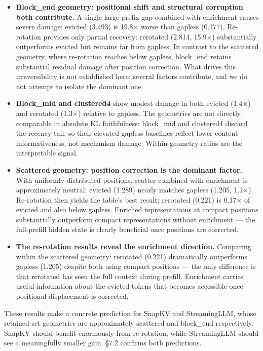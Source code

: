 \documentclass[10pt,letterpaper]{article}
\providecommand{\tightlist}{%
  \setlength{\itemsep}{0pt}\setlength{\parskip}{0pt}}
\begin{document}
\begin{itemize}
\tightlist
\item
  \textbf{Block\_end geometry: positional shift and structural
  corruption both contribute.} A single large prefix gap combined with
  enrichment causes severe damage: evicted (3.493) is 19.8× worse than
  gapless (0.177).
  Re-rotation provides only partial recovery: rerotated (2.814, 15.9×)
  substantially outperforms evicted but remains far from gapless. In
  contrast to the scattered geometry, where re-rotation reaches below
  gapless, block\_end retains substantial residual damage after position
  correction. What drives this irreversibility is not established here;
  several factors contribute, and we do not attempt to isolate the
  dominant one.
\item
  \textbf{Block\_mid and clustered4} show modest damage in both evicted
  (1.4×) and rerotated (1.3×) relative to gapless. The geometries are
  not directly comparable in absolute KL faithfulness: block\_mid and
  clustered4 discard the recency tail, so their elevated gapless
  baselines reflect lower content informativeness, not mechanism damage.
  Within-geometry ratios are the interpretable signal.
\item
  \textbf{Scattered geometry: position correction is the dominant
  factor.} With uniformly-distributed positions, scatter combined with
  enrichment is approximately neutral: evicted (1.289) nearly matches
  gapless (1.205, 1.1×). Re-rotation then yields the table's best
  result: rerotated (0.221) is 0.17× of evicted and also below gapless.
  Enriched representations at compact positions substantially outperform
  compact representations without enrichment --- the full-prefill hidden
  state is clearly beneficial once positions are corrected.
\item
  \textbf{The re-rotation results reveal the enrichment direction.}
  Comparing within the scattered geometry: rerotated (0.221) dramatically
  outperforms gapless (1.205) despite both using compact positions ---
  the only difference is that rerotated has seen the full context during
  prefill. Enrichment carries useful information about the evicted tokens
  that becomes accessible once positional displacement is corrected.
\end{itemize}

These results make a concrete prediction for SnapKV and StreamingLLM,
whose retained-set geometries are approximately scattered and block\_end
respectively: SnapKV should benefit enormously from re-rotation, while
StreamingLLM should see a meaningfully smaller gain.
§7.2 confirms both predictions.
\end{document}
